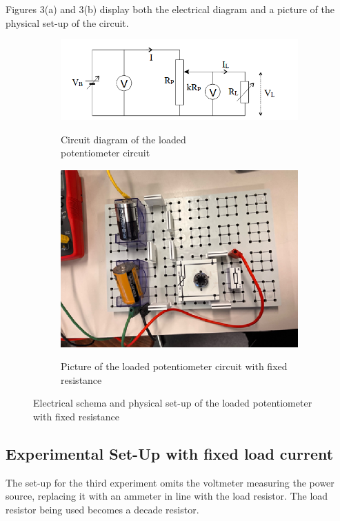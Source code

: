 \documentclass[a4paper]{article}
\begin{document}
Figures 3(a) and 3(b) display both the electrical diagram and a picture of the
physical set-up of the circuit.
\begin{figure}[!ht]
    \centering
    \begin{subfigure}{0.5\textwidth}
        \centering
        \includegraphics[width = \linewidth]{loaded pot fixed circuit.png}
        \label{fig:3a}
        \caption{Circuit diagram of the loaded \\potentiometer circuit \cite{report}}
    \end{subfigure}%
    \begin{subfigure}{0.5\textwidth}
        \centering
        \includegraphics[width = 0.8\linewidth]{loaded pot fixed pic.png}
        \label{fig:3b}
        \caption{Picture of the loaded potentiometer circuit with fixed resistance}        
    \end{subfigure}
    \caption{Electrical schema and physical set-up of the loaded potentiometer with fixed resistance}
\end{figure}
\newpage
\subsection{Experimental Set-Up with fixed load current}
The set-up for the third experiment omits the voltmeter measuring the power
source, replacing it with an ammeter in line with the load resistor. The load
resistor being used becomes a decade resistor.
\end{document}
